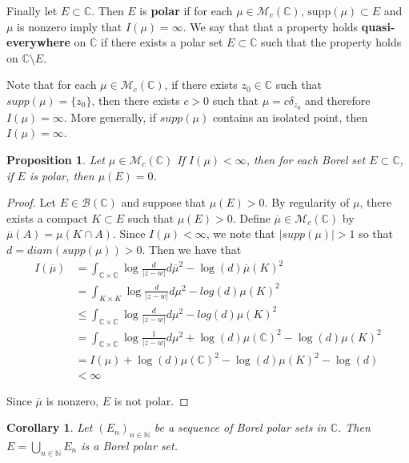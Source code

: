 \documentclass[12pt]{amsart}
\newtheorem{prop}[thm]{Proposition}
\newtheorem{cor}[thm]{Corollary}
\theoremstyle{definition}
\theoremstyle{remark}
\theoremstyle{definition}
\newcommand{\N}{\mathbb{N}}
\newcommand{\C}{\mathbb{C}}
\newcommand{\MCM}{\mathcal{M}}
\newcommand{\MCB}{\mathcal{B}}
\begin{document}
Finally let $E \subset \C$. Then $E$ is \textbf{polar} if for each $\mu \in \MCM_c(\C)$, $\mathrm{supp}(\mu) \subset E$ and $\mu$ is nonzero imply that $I(\mu) = \infty$.  We say that that a property holds \textbf{quasi-everywhere} on $\C$ if there exists a polar set $E \subset \C$ such that the property holds on $\C\setminus E$.

Note that for each $\mu \in \MCM_c(\C)$, if there exists $z_0 \in \C$ such that $supp(\mu) = \{z_0\}$, then there exists $c>0$ such that $\mu = c\delta_{z_0}$ and therefore $I(\mu) = \infty$. More generally, if $supp(\mu)$ contains an isolated point, then $I(\mu) = \infty$.

\begin{prop}

Let $\mu \in \MCM_c(\C)$ If $I(\mu) < \infty$, then for each Borel set $E \subset \C$, if $E$ is polar, then $\mu(E)=0$.

\end{prop}

\begin{proof}
Let $E \in \MCB(\C)$ and suppose that $\mu(E) > 0$. By regularity of $\mu$, there exists a compact $K \subset E$ such that $\mu(E) >0$. Define $\overline{\mu} \in \MCM_c(\C)$ by $\overline{\mu}(A)= \mu(K\cap A)$. Since $I(\mu)< \infty$, we note that $|supp(\mu)| > 1$ so that $d = diam(supp(\mu)) >0$. Then we have that 
\begin{align*}
I(\overline{\mu}) 
&=\int_{\C \times \C} \log \frac{d}{|z-w|}d\overline{\mu}^2 -\log(d)\overline{\mu}(K)^2\\
&= \int_{K \times K} \log\frac{d}{|z-w|}d\mu^2 - log(d)\mu(K)^2\\
&\leq \int_{\C \times \C} \log \frac{d}{|z-w|}d\mu^2 - log(d)\mu(K)^2\\
&=\int_{\C \times \C} \log \frac{1}{|z-w|} d\mu^2 + \log(d)\mu(\C)^2 - \log(d)\mu(K)^2\\
&= I(\mu) + \log(d)\mu(\C)^2 - \log(d)\mu(K)^2 - \log(d)\\
& < \infty
\end{align*}

Since $\overline{\mu}$ is nonzero, $E$ is not polar.

\end{proof}

\begin{cor}
Let $(E_n)_{n \in \N}$ be a sequence of Borel polar sets in $\C$. Then $E = \bigcup\limits_{n \in \N}E_n$ is a Borel polar set. 
\end{cor}
\end{document}

